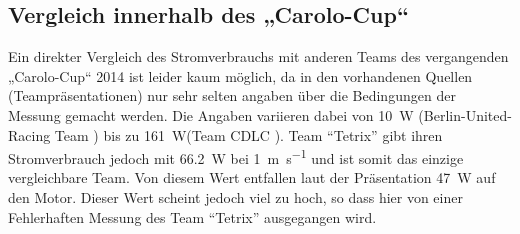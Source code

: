\subsection{Vergleich innerhalb des „Carolo-Cup“}
Ein direkter Vergleich des Stromverbrauchs mit anderen Teams des vergangenden „Carolo-Cup“ 2014 ist leider kaum möglich, da in den vorhandenen Quellen (Teampräsentationen) nur sehr selten
angaben über die Bedingungen der Messung gemacht werden. Die Angaben variieren dabei von \SI{10}{\W} (Berlin-United-Racing Team \cite{cc-bu}) bis zu \SI{161}{\W}(Team CDLC \cite{cc-cdlc}).
Team ``Tetrix''\cite{cc-tx} gibt ihren Stromverbrauch jedoch mit \SI{66,2}{\W} bei \SI{1}{\metre\per\second} und ist somit das einzige vergleichbare Team. Von diesem Wert entfallen
laut der Präsentation \SI{47}{\W} auf den Motor. Dieser Wert scheint jedoch viel zu hoch, so dass hier von einer Fehlerhaften Messung des Team ``Tetrix'' ausgegangen wird.

